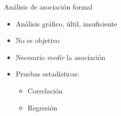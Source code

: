 \documentclass[
  11pt,
  ignorenonframetext,
]{beamer}
\begin{document}
\begin{frame}{Análisis de asociación formal}
\begin{itemize}
\item
  Análisis gráfico, últil, insuficiente
\item
  No es objetivo
\item
  Necesario \emph{medir} la asociación
\item
  Pruebas estadísticas:

  \begin{itemize}
  \item
    Correlación
  \item
    Regresión
  \end{itemize}
\end{itemize}
\end{frame}
\end{document}
